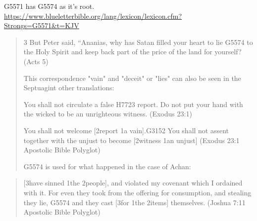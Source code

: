 \documentclass[11pt]{article}
\begin{document}
\begin{thebibliography}{37}
G5571 has G5574 as it's root. \newline
\url{https://www.blueletterbible.org/lang/lexicon/lexicon.cfm?Strongs=G5571&t=KJV}

\begin{quote}
3 But Peter said, “Ananias, why has Satan filled your heart to lie G5574 to the Holy Spirit and keep back part of the price of the land for yourself?
(Acts 5)

This correspondence "vain" and "deceit" or "lies" can also be seen in the Septuagint other translations:

You shall not circulate a false H7723 report. Do not put your hand with the wicked to be an unrighteous witness.\newline
(Exodus 23:1)

You shall not welcome [2report 1a vain].G3152 You shall not assent together with the unjust to become [2witness 1an unjust]\newline
(Exodus 23:1 Apostolic Bible Polyglot)\newline

G5574 is used for what happened in the case of Achan:\newline
\end{quote}
\begin{quote}
[3have sinned 1the 2people], and violated my covenant which I ordained with it. For even they took from the offering for consumption, and stealing they lie, G5574 and they cast [3for 1the 2items] themselves.\newline
(Joshua 7:11 Apostolic Bible Polyglot)\newline


\end{quote}
\end{thebibliography}
\end{document}
